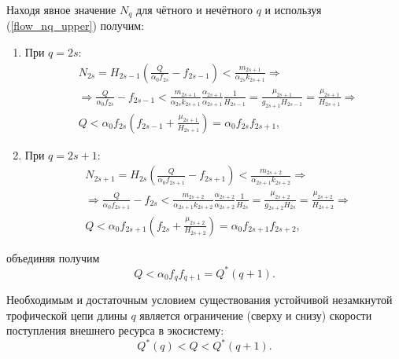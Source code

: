     Находя явное значение \(N_q\) для чётного и нечётного \(q\) и используя (\ref{flow_nq_upper}) получим:
    \begin{enumerate}
        \item При \(q = 2s\):
        \begin{equation}
            \begin{split}
                & N_{2s} = H_{2s-1} \left( \frac{Q}{\alpha_0 f_{2s}} - f_{2s-1} \right) < \frac{m_{2s+1}}{\alpha_{2s} k_{2s+1}} \Rightarrow \\
                & \Rightarrow \frac{Q}{\alpha_0 f_{2s}} - f_{2s-1} < \frac{m_{2s+1}}{\alpha_{2s} k_{2s+1}} \frac{\alpha_{2s+1}}{\alpha_{2s+1}} \frac{1}{H_{2s-1}} = \frac{\mu_{2s+1}}{g_{2s+1} H_{2s-1}} = \frac{\mu_{2s+1}}{H_{2s+1}} \Rightarrow \\
                & Q < \alpha_0 f_{2s} \left(  f_{2s-1} + \frac{\mu_{2s+1}}{H_{2s+1}} \right) = \alpha_0 f_{2s} f_{2s+1},        
            \end{split}
        \end{equation}
        
        \item При \(q = 2s+1\):
        \begin{equation}
            \begin{split}
                & N_{2s+1} = H_{2s} \left( \frac{Q}{\alpha_0 f_{2s+1}} - f_{2s+1} \right) < \frac{m_{2s+2}}{\alpha_{2s+1} k_{2s+2}} \Rightarrow \\
                & \Rightarrow \frac{Q}{\alpha_0 f_{2s+1}} - f_{2s} < \frac{m_{2s+2}}{\alpha_{2s+1} k_{2s+2}} \frac{\alpha_{2s+2}}{\alpha_{2s+2}} \frac{1}{H_{2s}} = \frac{\mu_{2s+2}}{g_{2s+2} H_{2s}} = \frac{\mu_{2s+2}}{H_{2s+2}} \Rightarrow \\
                & Q < \alpha_0 f_{2s+1} \left(  f_{2s} + \frac{\mu_{2s+2}}{H_{2s+2}} \right) = \alpha_0 f_{2s+1} f_{2s+2},      
            \end{split}
        \end{equation}
    \end{enumerate}
    объединяя получим
    \begin{equation}
        Q < \alpha_0 f_{q} f_{q+1} = Q^*(q+1).
    \end{equation}

    \begin{corollary}
        Необходимым и достаточным условием существования устойчивой незамкнутой трофической цепи длины \(q\) является ограничение (сверху и снизу) скорости поступления внешнего ресурса в экосистему:
        \begin{equation}
            Q^*(q) < Q < Q^*(q+1).
        \end{equation}
    \end{corollary}
